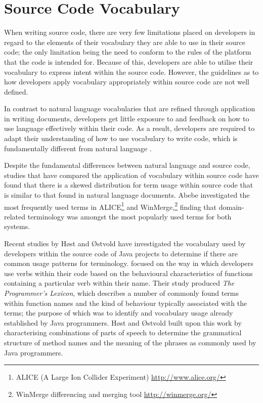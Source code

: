 
\section{Source Code Vocabulary} %
\label{sec:source_code_vocabulary}

When writing source code, there are very few limitations placed on developers in regard to the elements of their vocabulary they are able to use in their source code; the only limitation being the need to conform to the rules of the platform that the code is intended for. Because of this, developers are able to utilise their vocabulary to express intent within the source code. However, the guidelines as to how developers apply vocabulary appropriately within source code are not well defined.

In contrast to natural language vocabularies that are refined through application in writing documents, developers get little exposure to and feedback on how to use language effectively within their code. As a result, developers are required to adapt their understanding of how to use vocabulary to write code, which is fundamentally different from natural language \cite{Naur75a}.

Despite the fundamental differences between natural language and source code, studies that have compared the application of vocabulary within source code \cite{Pierret09a, Delorey09a} have found that there is a skewed distribution for term usage within source code that is similar to that found in natural language documents. Abebe \etal \cite{Abebe09a} investigated the most frequently used terms in ALICE\footnote{ALICE (A Large Ion Collider Experiment) \url{http://www.alice.org/}} and WinMerge,\footnote{WinMerge differencing and merging tool \url{http://winmerge.org/}} finding that domain-related terminology was amongst the most popularly used terms for both systems.

Recent studies by H{\o}st and {\O}stvold \cite{Host07b, Host09a} have investigated the vocabulary used by developers within the source code of Java projects to determine if there are common usage patterns for terminology. \cite{Host07b} focused on the way in which developers use verbs within their code based on the behavioural characteristics of functions containing a particular verb within their name. Their study produced \emph{The Programmer's Lexicon}, which describes a number of commonly found terms within function names and the kind of behaviour typically associated with the terms; the purpose of which was to identify and vocabulary usage already established by Java programmers. H{\o}st and {\O}stvold built upon this work \cite{Host09a} by characterising combinations of parts of speech to determine the grammatical structure of method names and the meaning of the phrases as commonly used by Java programmers.

